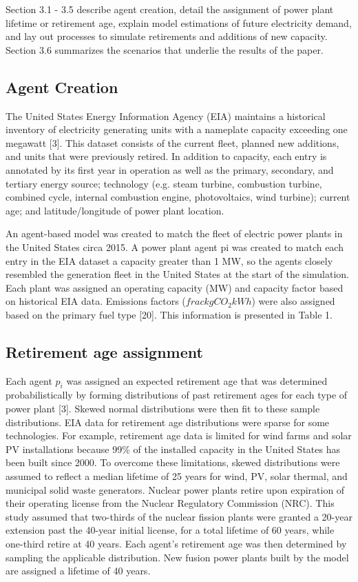 \documentclass[preprint, 12pt]{elsarticle}
\begin{document}
Section 3.1 - 3.5 describe agent creation, detail the assignment of power plant lifetime or retirement age, explain model estimations of future electricity demand, and lay out processes to simulate retirements and additions of new capacity. Section 3.6 summarizes the scenarios that underlie the results of the paper.

\subsection{Agent Creation}

The United States Energy Information Agency (EIA) maintains a historical inventory of electricity generating units with a nameplate capacity exceeding one megawatt [3]. This dataset consists of the current fleet, planned new additions, and units that were previously retired. In addition to capacity, each entry is annotated by its first year in operation as well as the primary, secondary, and tertiary energy source; technology (e.g. steam turbine, combustion turbine, combined cycle, internal combustion engine, photovoltaics, wind turbine); current age; and latitude/longitude of power plant location.

An agent-based model was created to match the fleet of electric power plants in the United States circa 2015. A power plant agent pi was created to match each entry in the EIA dataset a capacity greater than 1 MW, so the agents closely resembled the generation fleet in the United States at the start of the simulation. Each plant was assigned an operating capacity (MW) and capacity factor based on historical EIA data. Emissions factors ($frac{kg CO_2}{kWh}$) were also assigned based on the primary fuel type [20]. This information is presented in Table 1.

\subsection{Retirement age assignment}

Each agent $p_i$ was assigned an expected retirement age that was determined probabilistically by forming distributions of past retirement ages for each type of power plant [3]. Skewed normal distributions were then fit to these sample distributions. EIA data for retirement age distributions were sparse for some technologies. For example, retirement age data is limited for wind farms and solar PV installations because 99\% of the installed capacity in the United States has been built since 2000. To overcome these limitations, skewed distributions were assumed to reflect a median lifetime of 25 years for wind, PV, solar thermal, and municipal solid waste generators. Nuclear power plants retire upon expiration of their operating license from the Nuclear Regulatory Commission (NRC). This study assumed that two-thirds of the nuclear fission plants were granted a 20-year extension past the 40-year initial license, for a total lifetime of 60 years, while one-third retire at 40 years. Each agent’s retirement age was then determined by sampling the applicable distribution. New fusion power plants built by the model are assigned a lifetime of 40 years.
\end{document}
